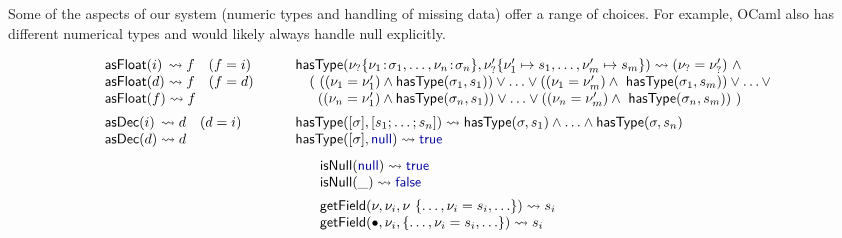\documentclass[10pt,preprint,blind,clearpagebib]{sigplanconf}
\newcommand{\kvd}[1]{\textnormal{\textcolor{kvdclr}{\sffamily #1}}}
\newcommand{\ident}[1]{\textnormal{\sffamily #1}}
\newcommand{\reduce}{\rightsquigarrow}
\begin{document}
Some of the aspects of our system (numeric types and handling of missing data) offer a range of
choices. For example, OCaml also has different numerical types and would likely always handle 
\kvd{null} explicitly.


\begin{figure}
\noindent
\begin{equation*}
\begin{array}{l}
\ident{asFloat}(i) \,\reduce f\quad(f = i)\\
\ident{asFloat}(d) \reduce f\quad(f = d)\\
\ident{asFloat}(f) \reduce f
\\[0.5em]
\ident{asDec}(i) \,\reduce d\quad(d = i)\\
\ident{asDec}(d) \reduce d
\end{array}
\qquad
\begin{array}{l}
\ident{hasType}(\nu_? \{ \nu_1 \!:\! \sigma_1, \ldots, \nu_n \!:\! \sigma_n \}, \nu'_? \{ \nu'_1\mapsto s_1, \ldots, \nu'_m\mapsto s_m \}) \reduce (\nu_? = \nu'_?) ~\wedge \\
  \quad (~ ((\nu_1 = \nu'_1) \wedge \ident{hasType}(\sigma_1, s_1)) \vee\ldots\vee ((\nu_1 = \nu'_m) \wedge \ident{hasType}(\sigma_1, s_m)) \vee \ldots \vee\\
  \quad ~\; ((\nu_n = \nu'_1) \wedge \ident{hasType}(\sigma_n, s_1)) \vee\ldots\vee ((\nu_n = \nu'_m) \wedge \ident{hasType}(\sigma_n, s_m))~)
\\[0.5em]
\ident{hasType}([\sigma], [s_1; \ldots; s_n]) \reduce \ident{hasType}(\sigma, s_1)\wedge\ldots\wedge\ident{hasType}(\sigma, s_n) \\
\ident{hasType}([\sigma], \kvd{null}) \reduce \kvd{true} \\  
\end{array}  
\end{equation*}
%
\vspace{-0.5em}
%
\begin{equation*}
\begin{array}{l}
\ident{isNull}(\kvd{null}) \reduce \kvd{true} \\
\ident{isNull}(\_) \reduce \kvd{false} 
\\[0.5em]
\ident{getField}(\nu,\nu_i, \nu~\{\ldots, \nu_i=s_i, \ldots\}) \reduce s_i\\
\ident{getField}(\bullet, \nu_i, \{\ldots, \nu_i=s_i, \ldots\}) \reduce s_i\\

\end{array}
\end{equation*}
\end{figure}
\end{document}
